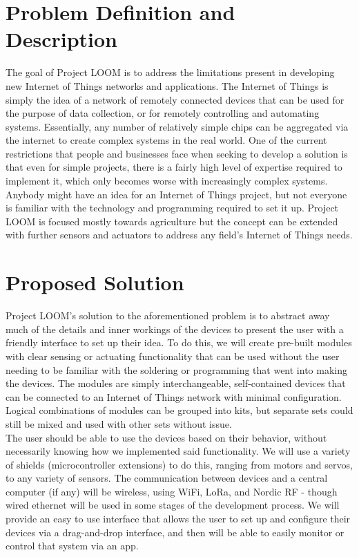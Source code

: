 \documentclass[onecolumn, draftclsnofoot,10pt, compsoc]{IEEEtran}
\begin{document}
\section{Problem Definition and Description}
    The goal of Project LOOM is to address the limitations present in developing new Internet of Things networks and applications. The Internet of Things is simply the idea of a network of remotely connected devices that can be used for the purpose of data collection, or for remotely controlling and automating systems. Essentially, any number of relatively simple chips can be aggregated via the internet to create complex systems in the real world. One of the current restrictions that people and businesses face when seeking to develop a solution is that even for simple projects, there is a fairly high level of expertise required to implement it, which only becomes worse with increasingly complex systems. Anybody might have an idea for an Internet of Things project, but not everyone is familiar with the technology and programming required to set it up. Project LOOM is focused mostly towards agriculture but the concept can be extended with further sensors and actuators to address any field’s Internet of Things needs. 

\section{Proposed Solution}
    Project LOOM’s solution to the aforementioned problem is to abstract away much of the details and inner workings of the devices to present the user with a friendly interface to set up their idea. To do this, we will create pre-built modules with clear sensing or actuating functionality that can be used without the user needing to be familiar with the soldering or programming that went into making the devices. The modules are simply interchangeable, self-contained devices that can be connected to an Internet of Things network with minimal configuration. Logical combinations of modules can be grouped into kits, but separate sets could still be mixed and used with other sets without issue. \\
    The user should be able to use the devices based on their behavior, without necessarily knowing how we implemented said functionality. We will use a variety of shields (microcontroller extensions) to do this, ranging from motors and servos, to any variety of sensors. The communication between devices and a central computer (if any) will be wireless, using WiFi, LoRa, and Nordic RF - though wired ethernet will be used in some stages of the development process. We will provide an easy to use interface that allows the user to set up and configure their devices via a drag-and-drop interface, and then will be able to easily monitor or control that system via an app.
\end{document}

